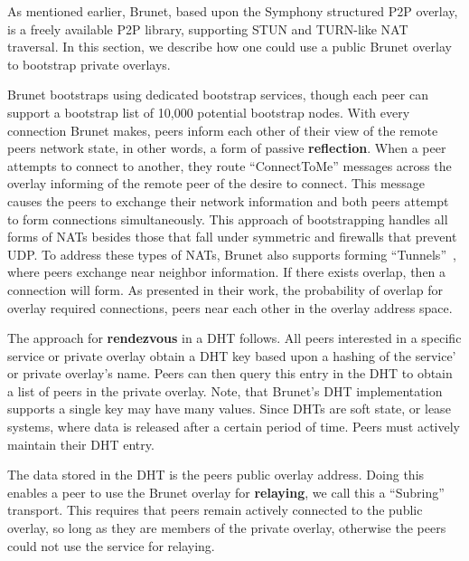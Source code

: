 \documentclass[conference]{IEEEtran}
\begin{document}
As mentioned earlier, Brunet, based upon the Symphony structured P2P overlay,
is a freely available P2P library, supporting STUN and TURN-like NAT traversal.
In this section, we describe how one could use a public Brunet overlay to
bootstrap private overlays.  

Brunet bootstraps using dedicated bootstrap services, though each peer can
support a bootstrap list of 10,000 potential bootstrap nodes.  With every
connection Brunet makes, peers inform each other of their view of the remote
peers network state, in other words, a form of passive \textbf{reflection}.
When a peer attempts to connect to another, they route ``ConnectToMe'' messages
across the overlay informing of the remote peer of the desire to connect.  This
message causes the peers to exchange their network information and both peers
attempt to form connections simultaneously.  This approach of bootstrapping
handles all forms of NATs besides those that fall under symmetric and firewalls
that prevent UDP.  To address these types of NATs, Brunet also supports forming
``Tunnels''~\cite{hpdc08_0}, where peers exchange near neighbor information.
If there exists overlap, then a connection will form.  As presented in their
work, the probability of overlap for overlay required connections, peers near
each other in the overlay address space.

The approach for \textbf{rendezvous} in a DHT follows.  All peers interested in
a specific service or private overlay obtain a DHT key based upon a hashing of
the service' or private overlay's name.  Peers can then query this entry in the
DHT to obtain a list of peers in the private overlay.  Note, that Brunet's DHT
implementation supports a single key may have many values.  Since DHTs are soft
state, or lease systems, where data is released after a certain period of time.
Peers must actively maintain their DHT entry.  

The data stored in the DHT is the peers public overlay address.  Doing this
enables a peer to use the Brunet overlay for \textbf{relaying}, we call this a
``Subring'' transport.  This requires that peers remain actively connected to
the public overlay, so long as they are members of the private overlay,
otherwise the peers could not use the service for relaying.
\end{document}
